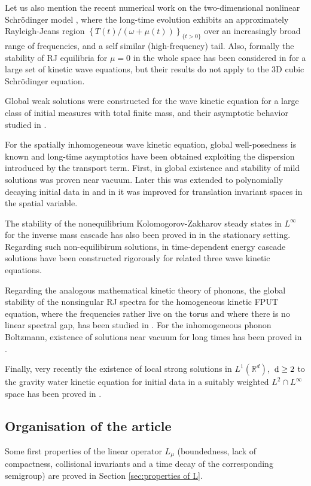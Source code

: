 \documentclass[reqno,11pt,letterpaper]{amsart}
\numberwithin{equation}{section}
\newcommand{\dd}{\, {\rm d}}
\newcommand{\RR}{{\mathbb R}}
\begin{document}
Let us also mention the recent numerical work on the two-dimensional nonlinear Schr\"odinger model \cite{Laurie26}, where the long-time evolution exhibits an approximately Rayleigh-Jeans region $\left\{{T(t)}/(\omega+\mu(t) )\right\}_{\{t>0\}}$ over an increasingly broad range of frequencies, and a self similar (high-frequency) tail.
Also, formally the stability of RJ equilibria for $\mu =0$ in the whole space has been considered in \cite{ZakLvovFalkov} for a large set of kinetic wave equations, but their results do not apply to the 3D cubic Schr\"odinger equation. 


Global weak solutions were constructed for the wave kinetic equation for a large class of initial measures with total finite mass, and their asymptotic behavior studied in \cite{EV13}.

For the spatially inhomogeneous wave kinetic equation, global well-posedness is known and long-time asymptotics have been obtained exploiting the dispersion introduced by the transport term. First,  in \cite{Ioakeim22} global existence and stability of mild solutions was proven near vacuum. Later this was extended to polynomially decaying initial data in \cite{AmpMillPavlovTaskov} and in \cite{AmpatzoglouLeger25} it was improved for translation invariant spaces in the spatial variable.

The stability of the nonequilibrium Kolomogorov-Zakharov steady states in $L^\infty$ for the inverse mass cascade has also been proved in \cite{CDG22} in the stationary setting. Regarding such non-equilibirum solutions, in \cite{SofferTran2020} time-dependent energy cascade solutions have been constructed rigorously for related three wave kinetic equations. 


Regarding the analogous mathematical kinetic theory of phonons, the global stability of the nonsingular RJ spectra for the homogeneous kinetic FPUT equation, where the frequencies rather live on the torus and where there is no linear spectral gap, has been studied in \cite{GerLaMen26, GerLaMen26review}. For the inhomogeneous phonon Boltzmann, existence of solutions near vacuum for long times has been proved in \cite{Xiang}.

Finally, very recently the existence of local strong solutions in $L^1(\RR^d)$, $\dd\ge 2$ to the gravity water kinetic equation for initial data in a suitably weighted $L^2\cap L^\infty $ space has been proved in \cite{pan2026}.


 \subsection{Organisation of the article}
 Some first properties of the linear operator $L_\mu $ (boundedness, lack of compactness, collisional invariants and a time decay of the corresponding semigroup) are proved in Section \ref{sec:properties of L}. 
 
\end{document}
